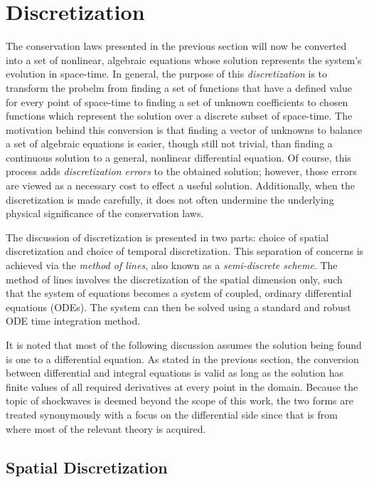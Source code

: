 \documentclass[12pt]{../UWMadThesis}
\begin{document}
\chapter{Discretization}

The conservation laws presented in the previous section will now be converted into a set of nonlinear, algebraic equations whose solution represents the system's evolution in space-time.
In general, the purpose of this \textit{discretization} is to transform the probelm from finding a set of functions that have a defined value for every point of space-time to finding a set of unknown coefficients to chosen functions which represent the solution over a discrete subset of space-time.
The motivation behind this conversion is that finding a vector of unknowns to balance a set of algebraic equations is easier, though still not trivial, than finding a continuous solution to a general, nonlinear differential equation.
Of course, this process adds \textit{discretization errors} to the obtained solution; however, those errors are viewed as a necessary cost to effect a useful solution.
Additionally, when the discretization is made carefully, it does not often undermine the underlying physical significance of the conservation laws.

The discussion of discretization is presented in two parts: choice of spatial discretization and choice of temporal discretization.
This separation of concerns is achieved via the \textit{method of lines}, also known as a \textit{semi-discrete scheme}.
The method of lines involves the discretization of the spatial dimension only, such that the system of equations becomes a system of coupled, ordinary differential equations (ODEs).
The system can then be solved using a standard and robust ODE time integration method.

It is noted that most of the following discussion assumes the solution being found is one to a differential equation.
As stated in the previous section, the conversion between differential and integral equations is valid as long as the solution has finite values of all required derivatives at every point in the domain.
Because the topic of shockwaves is deemed beyond the scope of this work, the two forms are treated synonymously with a focus on the differential side since that is from where most of the relevant theory is acquired.


\section{Spatial Discretization}
\end{document}
